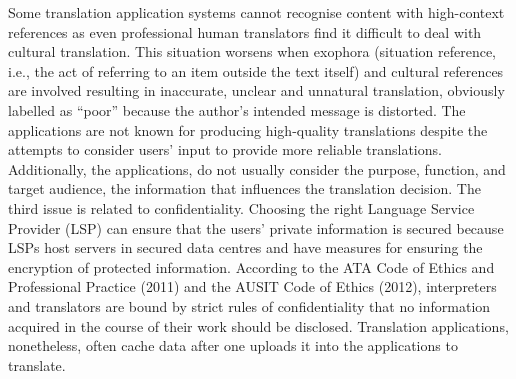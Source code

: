 \documentclass[english]{textolivre}
\begin{document}
Some translation application systems cannot recognise content with high-context references as even professional human translators find it difficult to deal with cultural translation. This situation worsens when exophora (situation reference, i.e., the act of referring to an item outside the text itself) and cultural references are involved resulting in inaccurate, unclear and unnatural translation, obviously labelled as “poor” because the author’s intended message is distorted. The applications are not known for producing high-quality translations despite the attempts to consider users’ input to provide more reliable translations. Additionally, the applications, do not usually consider the purpose, function, and target audience, the information that influences the translation decision. The third issue is related to confidentiality. Choosing the right Language Service Provider (LSP) can ensure that the users’ private information is secured because LSPs host servers in secured data centres and have measures for ensuring the encryption of protected information. According to the ATA Code of Ethics and Professional Practice (2011) and the AUSIT Code of Ethics (2012), interpreters and translators are bound by strict rules of confidentiality that no information acquired in the course of their work should be disclosed. Translation applications, nonetheless, often cache data after one uploads it into the applications to translate.
\end{document}
